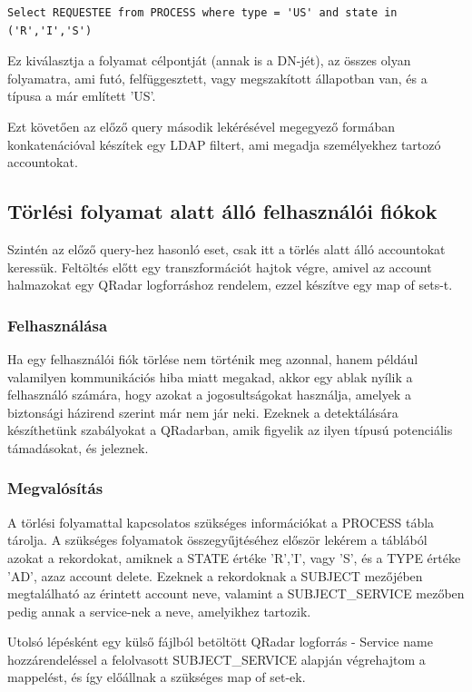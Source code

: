 		\begin{lstlisting}
Select REQUESTEE from PROCESS where type = 'US' and state in ('R','I','S')
\end{lstlisting}
		Ez kiválasztja a folyamat célpontját (annak is a DN-jét), az összes olyan folyamatra, ami futó, felfüggesztett, vagy megszakított állapotban van, és a típusa a már említett 'US'.
		
		Ezt követően az előző query második lekérésével megegyező formában konkatenációval készítek egy LDAP filtert, ami megadja személyekhez tartozó accountokat.
		
\subsection{Törlési folyamat alatt álló felhasználói fiókok} 
Szintén az előző query-hez hasonló eset, csak itt a törlés alatt álló accountokat keressük. Feltöltés előtt egy transzformációt hajtok végre, amivel az account halmazokat egy QRadar logforráshoz rendelem, ezzel készítve egy map of sets-t.  
	\subsubsection{Felhasználása}
		Ha egy felhasználói fiók törlése nem történik meg azonnal, 
		hanem például valamilyen kommunikációs hiba miatt megakad, akkor egy ablak nyílik a felhasználó számára, hogy azokat a jogosultságokat használja, amelyek a biztonsági házirend szerint már nem jár neki. Ezeknek a detektálására készíthetünk szabályokat a QRadarban, amik figyelik az ilyen típusú potenciális támadásokat, és jeleznek.
		 
	\subsubsection{Megvalósítás}
		A törlési folyamattal kapcsolatos szükséges információkat a PROCESS tábla tárolja. A szükséges folyamatok összegyűjtéséhez először lekérem a  táblából azokat a rekordokat, amiknek a STATE értéke 'R','I', vagy 'S', és a TYPE értéke 'AD', azaz account delete. Ezeknek a rekordoknak a SUBJECT mezőjében megtalálható az érintett account neve, valamint a SUBJECT\_SERVICE mezőben pedig annak a service-nek a neve, amelyikhez tartozik.
		
		Utolsó lépésként egy külső fájlból betöltött QRadar logforrás - Service name hozzárendeléssel a felolvasott SUBJECT\_SERVICE alapján végrehajtom a mappelést, és így előállnak a szükséges map of set-ek.
	
